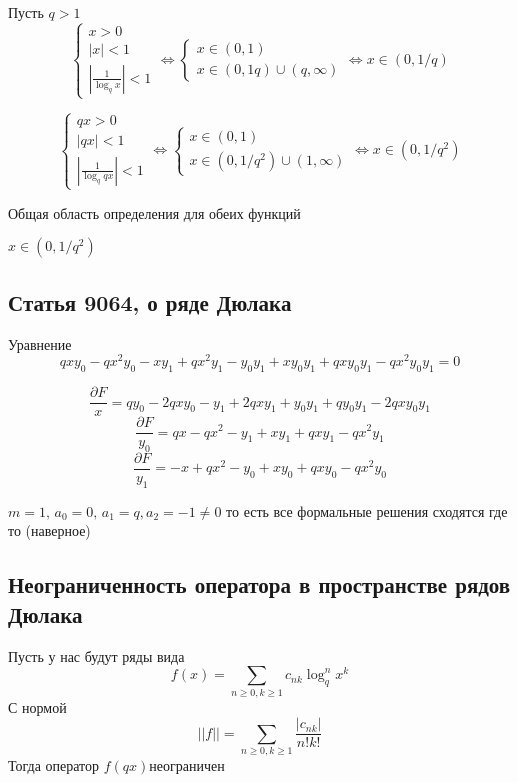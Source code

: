 \documentclass{article}
\begin{document}
	
	
	Пусть $q>1$
	\begin{equation}
		\begin{cases}
			x > 0\\
			|x| < 1 \\
			| \frac{1}{\log_q x} |<1
		\end{cases}
		\Leftrightarrow
		\begin{cases}
			x \in (0,1)\\
			x \in (0,1q) \cup (q,\infty)
		\end{cases}
		\Leftrightarrow
		x \in (0,1/q)
	\end{equation}
	
	\begin{equation}
		\begin{cases}
			q x > 0\\
			|q x| < 1\\
			| \frac{1}{\log_q qx} |<1
		\end{cases}
		\Leftrightarrow
		\begin{cases}
			x \in (0,1)\\
			x \in (0,1/q^2) \cup (1,\infty)
		\end{cases}
		\Leftrightarrow x \in (0,1/q^2)
	\end{equation}
	
	Общая область определения для обеих функций
	
	$x \in (0,1/q^2)$
	
	
	
	
	\subsection{Статья 9064, о ряде Дюлака}
	
	Уравнение 
	\[qx y_0 - q x^2 y_0 - x y_1 + qx^2 y_1 - y_0 y_1 + x y_0 y_1 + qxy_0y_1-qx^2y_0y_1=0\]
	
	\[\frac{\partial F}{x} = qy_0 - 2qxy_0 - y_1  + 2 q x y_1 + y_0 y_1 + q y_0 y_1  - 2qx y_0 y_1 \]
	\[\frac{\partial F}{y_0} = qx - qx^2 - y_1 + xy_1 + qxy_1 - qx^2y_1\]
	\[\frac{\partial F}{y_1} = -x + qx^2 - y_0 + xy_0 + qxy_0 - qx^2 y_0\]
	
	$ m = 1,\, a_0 = 0,\,a_1 = q, a_2 = -1 \neq 0 $ 
	то есть все формальные решения сходятся  где то (наверное)
	
	\subsection{Неограниченность оператора в пространстве рядов Дюлака}
	Пусть у нас будут ряды вида
	\begin{equation}
		f(x) = \sum_{n \geq 0,k\geq 1} c_{nk} \log_q^n x^k
	\end{equation}
	С нормой
	\begin{equation}
		||f|| = \sum_{n\geq 0 , k \geq 1} \frac{|c_{nk}|}{n!k!}
	\end{equation}
	Тогда оператор $f(qx) не  ограничен$
	
\end{document}
